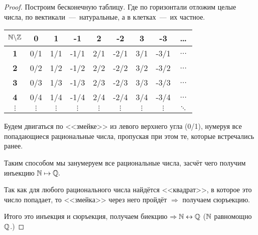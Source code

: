     \begin{proof}
        Построим бесконечную таблицу. Где по горизонтали отложим целые числа, по вектикали~---~натуральные, а в клетках~---~их частное.
    \begin{center}
\begin{tabular}{|c||c|c|c|c|c|c|c|c|}
\hline
\textbf{$\mathbb{N} \backslash \mathbb{Z}$} & \textbf{0} & \textbf{1} & \textbf{-1} & \textbf{2} & \textbf{-2} & \textbf{3} & \textbf{-3} & \textbf{\dots} \\ \hline \hline
\textbf{1}  & 0/1        & 1/1        & -1/1        & 2/1        & -2/1        & 3/1        & -3/1        & $\dots$          \\ \hline
\textbf{2}  & 0/2        & 1/2        & -1/2        & 2/2        & -2/2        & 3/2        & -3/2        & $\dots$          \\ \hline
\textbf{3}  & 0/3        & 1/3        & -1/3        & 2/3        & -2/3        & 3/3        & -3/3        & $\dots$          \\ \hline
\textbf{4}  & 0/4        & 1/4        & -1/4        & 2/4        & -2/4        & 3/4        & -3/4        & $\dots$          \\ \hline
\textbf{$\vdots$}  & $\vdots$          & $\vdots$          & $\vdots$           & $\vdots$          & $\vdots$           & $\vdots$          & $\vdots$           & $\ddots$         \\ \hline
\end{tabular}
\end{center}
Будем двигаться по <<змейке>> из левого верхнего угла (0/1), нумеруя все попадающиеся рациональные числа, пропуская при этом те, которые встречались ранее. 

\begin{center}
\end{center}

Таким способом мы занумеруем все рациональные числа, засчёт чего получим инъекцию $\mathbb{N} \mapsto \mathbb{Q}.$

Так как для любого рационального числа найдётся <<квадрат>>, в которое это число попадает, то <<змейка>> через него пройдёт $\Rightarrow$ получаем сюръекцию.

Итого это инъекция и сюръекция, получаем биекцию $\Rightarrow \mathbb{N} \leftrightarrow \mathbb{Q}$ ($\mathbb{N}$ равномощно $\mathbb{Q}$.)
    \end{proof}

